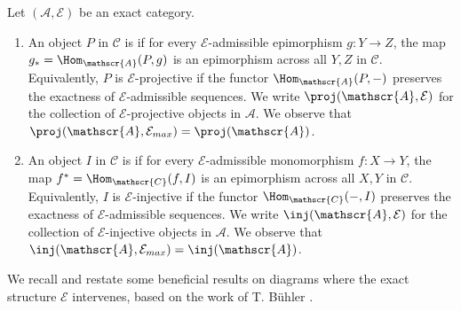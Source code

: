 \begin{definition}\label{def:Eprojectivesinjectives}
Let $(\mathscr{A}, \mathcal{E})$ be an exact category.
\begin{enumerate}[label=$\bullet$,itemsep=1mm]
    \item An object $P$ in $\mathscr{C}$ is  if for every $\mathcal{E}$-admissible epimorphism $g: Y \to Z$, the map $g_* = \Hom_\mathscr{A}(P,g)$ is an epimorphism across all $Y, Z$ in $\mathscr{C}$. Equivalently, $P$ is $\mathcal{E}$-projective if the functor $\Hom_\mathscr{A}(P,-)$ preserves the exactness of $\mathcal{E}$-admissible sequences. We write $\proj(\mathscr{A},\mathcal{E})$ for the collection of $\mathcal{E}$-projective objects in $\mathscr{A}$. We observe that $\proj(\mathscr{A},\mathcal{E}_{max}) = \proj(\mathscr{A})$.
    \item An object $I$ in $\mathscr{C}$ is  if for every $\mathcal{E}$-admissible monomorphism $f: X \to Y$, the map $f^* = \Hom_\mathscr{C}(f,I)$ is an epimorphism across all $X, Y$ in $\mathscr{C}$. Equivalently, $I$ is $\mathcal{E}$-injective if the functor $\Hom_\mathscr{C}(-,I)$ preserves the exactness of $\mathcal{E}$-admissible sequences. We write $\inj(\mathscr{A},\mathcal{E})$ for the collection of $\mathcal{E}$-injective objects in $\mathscr{A}$. We observe that $\inj(\mathscr{A},\mathcal{E}_{max}) = \inj(\mathscr{A})$.
\end{enumerate}
\end{definition}

We recall and restate some beneficial results on diagrams where the exact structure $\mathcal{E}$ intervenes, based on the work of T. Bühler \cite{B10}.

